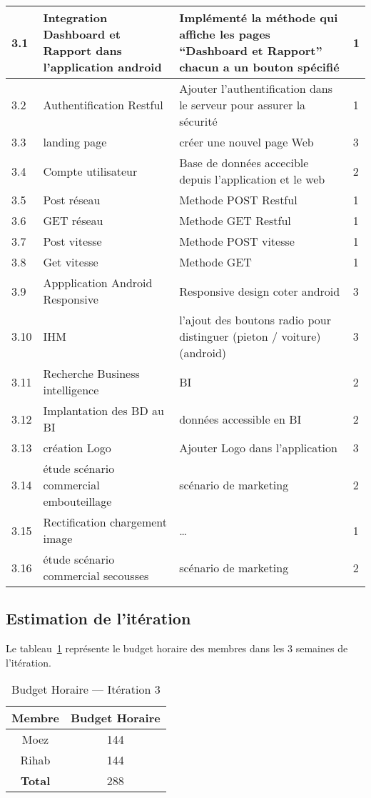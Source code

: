\begin{center}
\begin{longtable}{| p{1cm} | p{5cm} | p{7cm} | p{1cm} |}
\hline
3.1 & Integration Dashboard et Rapport dans l'application android & Implémenté la méthode qui affiche les pages ``Dashboard et Rapport'' chacun a un bouton spécifié   & 1 \\ \hline
3.2 & Authentification Restful  & Ajouter l'authentification dans le serveur pour assurer la sécurité   & 1 \\ \hline
3.3 & landing page & créer une nouvel page Web  & 3\\ \hline
3.4 & Compte utilisateur & Base de données accecible depuis l'application et le web& 2 \\ \hline
3.5 & Post réseau & Methode POST Restful & 1 \\ \hline
3.6 & GET réseau & Methode GET Restful & 1 \\ \hline
3.7 & Post vitesse & Methode POST vitesse & 1 \\ \hline
3.8 & Get vitesse & Methode GET & 1 \\ \hline
3.9 & Appplication Android Responsive & Responsive design coter android & 3 \\ \hline
3.10 & IHM & l'ajout des boutons radio pour distinguer (pieton / voiture)(android) & 3 \\ \hline
3.11 & Recherche Business intelligence & BI & 2 \\ \hline
3.12 & Implantation des BD au BI & données accessible en BI & 2\\ \hline
3.13 & création Logo &Ajouter Logo dans l'application & 3 \\ \hline
3.14 & étude scénario commercial embouteillage & scénario de marketing& 2\\ \hline
3.15 & Rectification chargement image & \ldots & 1 \\ \hline
3.16 & étude scénario commercial secousses & scénario de marketing& 2\\ \hline
\end{longtable}
\end{center}

\subsection{Estimation de l'itération}

Le tableau~\ref{tab:sprint3-capacity} représente le budget horaire des membres
dans les 3 semaines de l'itération.

\begin{table}[htbp]
    \centering
    \begin{tabular}{| c | c |}
\hline
\textbf{Membre} & \textbf{Budget Horaire} \\ \hline
\hline

Moez & 144\\ \hline
Rihab & 144 \\ \hline
\textbf{Total} & 288 \\ \hline
    \end{tabular}
    \caption{Budget Horaire --- Itération 3}
\label{tab:sprint3-capacity}
\end{table}

